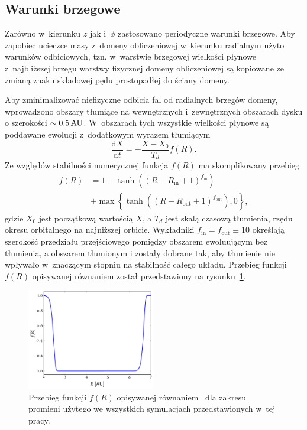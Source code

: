 \subsection{Warunki brzegowe}
Zarówno w~kierunku $z$ jak i~$\phi$ zastosowano periodyczne warunki brzegowe.
Aby zapobiec ucieczce masy z~domeny obliczeniowej w~kierunku radialnym użyto
warunków odbiciowych, tzn. w~warstwie brzegowej wielkości płynowe z~najbliższej
brzegu warstwy fizycznej domeny obliczeniowej są kopiowane ze zmianą znaku
składowej pędu prostopadłej do ściany domeny.

\par Aby zminimalizować niefizyczne odbicia fal od radialnych brzegów domeny,
wprowadzono obszary tłumiące na wewnętrznych i~zewnętrznych obszarach dysku o
szerokości $\sim0.5\hbox{$\thinspace\textrm{AU}$}$. W~obszarach tych wszystkie wielkości płynowe są
poddawane ewolucji z~dodatkowym wyrazem tłumiącym
\begin{equation}
  \frac{\textrm{d}X}{\textrm{d}t} = - \frac{X-X_0}{T_d}f(R).
\end{equation}
Ze względów stabilności numerycznej funkcja $f(R)$ ma skomplikowany przebieg
\begin{equation}\label{eq:overlap}
   \begin{split} 
      f(R) &= 1 - \tanh\left(\left(R - R_\textrm{in} + 1
      \right)^{f_\textrm{in}}\right)\\ &+ \max\left\{ \tanh\left(\left(R -
      R_\textrm{out} + 1\right)^{f_\textrm{out}}\right), 0\right\}, 
   \end{split}
\end{equation}
gdzie $X_0$ jest początkową wartością $X$, a $T_d$ jest skalą czasową tłumienia,
rzędu okresu orbitalnego na najniższej orbicie.
Wykładniki $f_\textrm{in}=f_\textrm{out}\equiv10$ określają szerokość przedziału
przejściowego pomiędzy obszarem ewoluującym bez tłumienia, a obszarem tłumionym
i zostały dobrane tak, aby tłumienie nie wpływało w~znaczącym stopniu na
stabilność całego układu. Przebieg funkcji $f(R)$ opisywanej równaniem
 został przedstawiony na rysunku~\ref{fig:overlap}.
%
\begin{figure}
   \centering
   \includegraphics[width=0.5\textwidth]{figures/overlap}
   \caption{Przebieg funkcji $f(R)$ opisywanej równaniem~ dla
   zakresu promieni użytego we wszystkich symulacjach przedstawionych w~tej
pracy.}
   \label{fig:overlap}
\end{figure}
%
